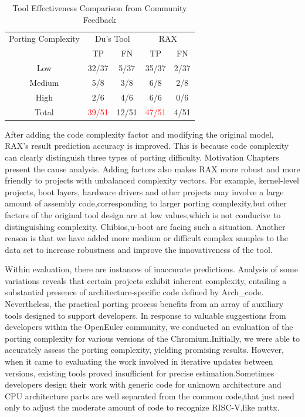 \documentclass[sigconf,screen,review,anonymous]{acmart}
\begin{document}
{\begin{table}
  \caption{Tool Effectiveness Comparison from Community Feedback}
  \label{tab:effectiveness}
  \begin{tabular}{ccccc}
    \toprule
    Porting Complexity & \multicolumn{2}{c}{Du's Tool} & \multicolumn{2}{c}{RAX} \\
     & TP & FN & TP & FN \\
    \midrule
    Low &32/37 & 5/37 & 35/37 & 2/37 \\
    Medium & 5/8 & 3/8 & 6/8 & 2/8 \\
    High & 2/6 & 4/6 & 6/6 & 0/6 \\
    \midrule
    Total & \textcolor{red}{39/51} & 12/51& \textcolor{red}{47/51} & 4/51 \\
      \bottomrule
\end{tabular}
\end{table}

After adding the code complexity factor and modifying the original model, RAX's result prediction accuracy is improved.
This is because code complexity can clearly distinguish three types of porting difficulty.
Motivation Chapters present the cause analysis.
Adding factors also makes RAX more robust and more friendly to projects with unbalanced complexity vectors.
For example, kernel-level projects, boot layers, hardware drivers and other projects may involve a large amount of assembly code,corresponding to larger porting complexity,but other factors of the original tool design are at low values,which is not conducive to distinguishing complexity.
Chibios,u-boot are facing such a situation. Another reason is that we have added more medium or difficult complex samples to the data set to increase robustness and improve the innovativeness of the tool.     




Within evaluation, there are instances of inaccurate predictions. Analysis of some variations reveals that certain projects exhibit inherent complexity, entailing a substantial presence of architecture-specific code defined by Arch\_code.
Nevertheless, the practical porting process benefits from an array of auxiliary tools designed to support developers. In response to valuable suggestions from developers within the OpenEuler community, we conducted an evaluation of the porting complexity for various versions of the Chromium.Initially, we were able to accurately assess the porting complexity, yielding promising results. However, when it came to evaluating the work involved in iterative updates between versions, existing tools proved insufficient for precise estimation.Sometimes developers design their work with generic code for unknown architecture and CPU architecture parts are well separated from the common code,that just need only to adjust the moderate amount of code to recognize RISC-V,like nuttx.
}
\end{document}
